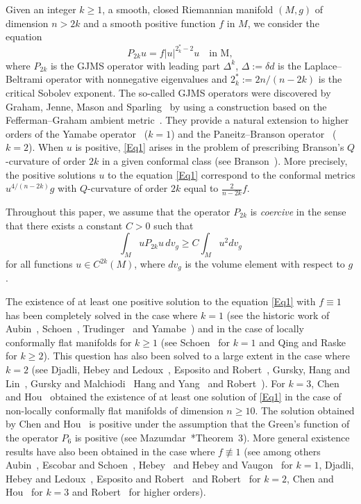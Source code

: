 \documentclass[reqno]{amsart}
\numberwithin{equation}{section}
\newcommand{\<}{\left<}
\renewcommand{\>}{\right>}
\renewcommand{\[}{\left[}
\renewcommand{\]}{\right]}
\renewcommand{\(}{\left(}
\renewcommand{\)}{\right)}
\begin{document}
Given an integer $k\ge1$, a smooth, closed Riemannian manifold $\(M,g\)$ of dimension $n>2k$ and a smooth positive function $f$ in $M$, we consider the equation
\begin{equation}\label{Eq1}
P_{2k}u=f\left|u\right|^{2^*_k-2}u\quad\text{in M},
\end{equation}
where $P_{2k}$ is the GJMS operator with leading part $\Delta^k$, $\Delta:=\delta d$ is the Laplace--Beltrami operator with nonnegative eigenvalues and $2^*_k:=2n/\(n-2k\)$ is the critical Sobolev exponent. The so-called GJMS operators were discovered by Graham, Jenne, Mason and Sparling~\cite{GraJenMasSpa} by using a construction based on the Fefferman--Graham ambient metric~\cites{FefGra1,FefGra2}. They provide a natural extension to higher orders of the Yamabe operator~\cite{Yam} ($k=1$) and the Paneitz--Branson operator~\cites{Bra1,Pan} ($k=2$). When $u$ is positive, \eqref{Eq1} arises in the problem of prescribing \nobreak Branson's $Q$-curvature of order $2k$ in a given conformal class (see Branson~\cites{Bra2}). More precisely, the positive solutions $u$ to the equation \eqref{Eq1} correspond to the conformal metrics $u^{4/\(n-2k\)}g$ with $Q$-curvature of order $2k$ equal to $\frac{2}{n-2k}f$. 

\smallskip
Throughout this paper, we assume that the operator $P_{2k}$ is {\it coercive} in the sense that there exists a constant $C>0$ such that 
$$\int_MuP_{2k}u\,dv_g\ge C\int_Mu^2dv_g$$ 
for all functions $u\in C^{2k}\(M\)$, where $dv_g$ is the volume element with respect to $g$.

\smallskip
The existence of at least one positive solution to the equation \eqref{Eq1} with $f\equiv1$ has been completely solved in the case where $k=1$ (see the historic work of Aubin~\cite{Aub}, Schoen~\cite{Sch1}, Trudinger~\cite{Tru} and Yamabe~\cite{Yam}) and in the case of locally conformally flat manifolds for $k\ge1$ (see Schoen~\cite{Sch2} for $k=1$ and Qing and Raske~\cite{QingRas} for $k\ge2$). This question has also been solved to a large extent in the case where $k=2$ (see Djadli, Hebey and Ledoux~\cite{DjaHebLed}, Esposito and Robert~\cite{EspRob}, Gursky, Hang and Lin~\cites{GurHangLin}, Gursky and Malchiodi~\cite{GurMal} Hang and Yang~\cites{HangYang1,HangYang2} and Robert~\cite{Rob1}). For $k=3$, Chen and Hou~\cite{ChenHou} obtained the existence of at least one solution of \eqref{Eq1} in the case of non-locally conformally flat manifolds of dimension $n\ge 10$. The solution obtained by Chen and Hou~\cite{ChenHou} is positive under the assumption that the Green's function of the operator $P_6$ is positive (see Mazumdar~\cite{Maz}*{Theorem~3}). More general existence results have also been obtained in the case where $f\not\equiv1$ (see among others Aubin~\cite{Aub}, Escobar and Schoen~\cite{EscSch}, Hebey~\cite{Heb} and Hebey and Vaugon~\cite{HebVau} for $k=1$, Djadli, Hebey and Ledoux~\cite{DjaHebLed}, Esposito and Robert~\cite{EspRob} and Robert~\cite{Rob1} for $k=2$, Chen and Hou~\cite{ChenHou} for $k=3$ and Robert~\cite{Rob2} for higher orders). 
\end{document}
